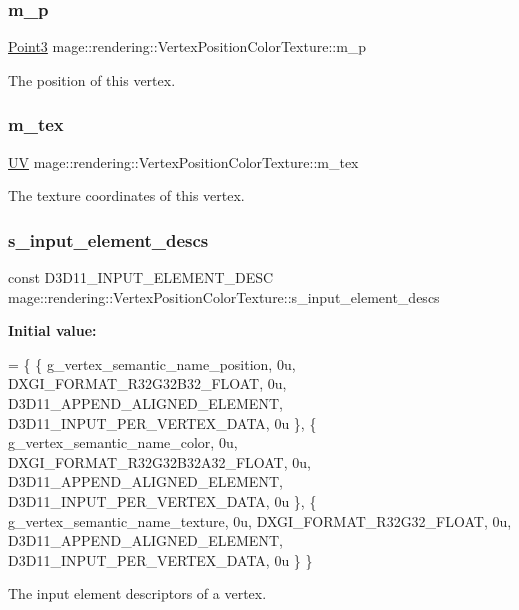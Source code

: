 \subsubsection{\texorpdfstring{m\+\_\+p}{m\_p}}
{\footnotesize\ttfamily \hyperlink{structmage_1_1_point3}{Point3} mage\+::rendering\+::\+Vertex\+Position\+Color\+Texture\+::m\+\_\+p}

The position of this vertex. \hypertarget{structmage_1_1rendering_1_1_vertex_position_color_texture_a48cb88cc9c5d68350249e192152a7104}{}\label{structmage_1_1rendering_1_1_vertex_position_color_texture_a48cb88cc9c5d68350249e192152a7104} 
\subsubsection{\texorpdfstring{m\+\_\+tex}{m\_tex}}
{\footnotesize\ttfamily \hyperlink{structmage_1_1_u_v}{UV} mage\+::rendering\+::\+Vertex\+Position\+Color\+Texture\+::m\+\_\+tex}

The texture coordinates of this vertex. \hypertarget{structmage_1_1rendering_1_1_vertex_position_color_texture_ac80470d80eea7ac62649bc9adb10ae07}{}\label{structmage_1_1rendering_1_1_vertex_position_color_texture_ac80470d80eea7ac62649bc9adb10ae07} 
\subsubsection{\texorpdfstring{s\+\_\+input\+\_\+element\+\_\+descs}{s\_input\_element\_descs}}
{\footnotesize\ttfamily const D3\+D11\+\_\+\+I\+N\+P\+U\+T\+\_\+\+E\+L\+E\+M\+E\+N\+T\+\_\+\+D\+E\+SC mage\+::rendering\+::\+Vertex\+Position\+Color\+Texture\+::s\+\_\+input\+\_\+element\+\_\+descs\hspace{0.3cm}{\ttfamily [static]}}

{\bfseries Initial value\+:}
\begin{DoxyCode}
= \{
        \{ g\_vertex\_semantic\_name\_position, 0u, DXGI\_FORMAT\_R32G32B32\_FLOAT,    0u, 
      D3D11\_APPEND\_ALIGNED\_ELEMENT, D3D11\_INPUT\_PER\_VERTEX\_DATA, 0u \},
        \{ g\_vertex\_semantic\_name\_color,    0u, DXGI\_FORMAT\_R32G32B32A32\_FLOAT, 0u, 
      D3D11\_APPEND\_ALIGNED\_ELEMENT, D3D11\_INPUT\_PER\_VERTEX\_DATA, 0u \},
        \{ g\_vertex\_semantic\_name\_texture,  0u, DXGI\_FORMAT\_R32G32\_FLOAT,       0u, 
      D3D11\_APPEND\_ALIGNED\_ELEMENT, D3D11\_INPUT\_PER\_VERTEX\_DATA, 0u \}
    \}
\end{DoxyCode}
The input element descriptors of a vertex. 